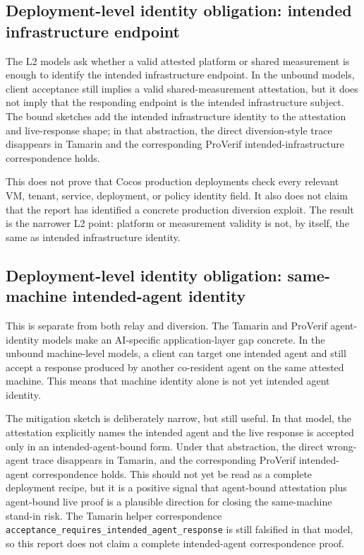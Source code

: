 \documentclass[11pt,a4paper]{article}
\begin{document}
\subsection{Deployment-level identity obligation: intended infrastructure endpoint}

The L2 models ask whether a valid attested platform or shared measurement is
enough to identify the intended infrastructure endpoint. In the unbound models,
client acceptance still implies a valid shared-measurement attestation, but it
does not imply that the responding endpoint is the intended infrastructure
subject. The bound sketches add the intended infrastructure identity to the
attestation and live-response shape; in that abstraction, the direct
diversion-style trace disappears in Tamarin and the corresponding ProVerif
intended-infrastructure correspondence holds.

This does not prove that Cocos production deployments check every relevant
VM, tenant, service, deployment, or policy identity field. It also does not
claim that the report has identified a concrete production diversion exploit.
The result is the narrower L2 point: platform or measurement validity is not,
by itself, the same as intended infrastructure identity.

\subsection{Deployment-level identity obligation: same-machine intended-agent identity}

This is separate from both relay and diversion. The Tamarin and ProVerif
agent-identity models make an AI-specific application-layer gap concrete. In
the unbound machine-level models, a client can target one intended agent and
still accept a response produced by another co-resident agent on the same
attested machine. This means that machine identity alone is not yet intended
agent identity.

The mitigation sketch is deliberately narrow, but still useful. In that model,
the attestation explicitly names the intended agent and the live response is
accepted only in an intended-agent-bound form. Under that abstraction, the
direct wrong-agent trace disappears in Tamarin, and the corresponding
ProVerif intended-agent correspondence holds. This should not yet be read as a
complete deployment recipe, but it is a positive signal that agent-bound
attestation plus agent-bound live proof is a plausible direction for closing
the same-machine stand-in risk. The Tamarin helper correspondence
\texttt{acceptance\_requires\_intended\_agent\_response} is still falsified in
that model, so this report does not claim a complete intended-agent
correspondence proof.
\end{document}
